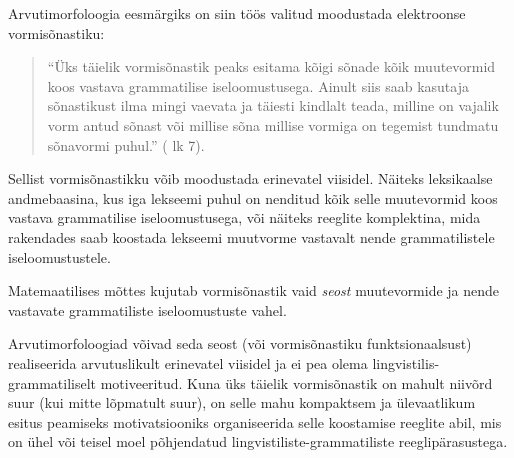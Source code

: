 \documentclass[12pt,a4paper]{article}
\begin{document}

Arvutimorfoloogia eesmärgiks on siin töös valitud moodustada elektroonse vormisõnastiku:
\begin{quote}
  ``Üks täielik vormisõnastik peaks esitama kõigi sõnade kõik muutevormid koos vastava grammatilise iseloomustusega. Ainult siis saab kasutaja sõnastikust ilma mingi vaevata ja täiesti kindlalt teada, milline on vajalik vorm antud sõnast või millise sõna millise vormiga on tegemist tundmatu sõnavormi puhul.'' (\cite{viks_vaike_1992} lk 7).
\end{quote}

Sellist vormisõnastikku võib moodustada erinevatel viisidel. Näiteks leksikaalse andme\-baasina, kus iga lekseemi puhul on nenditud kõik selle muutevormid koos vastava grammatilise iseloomustusega, või näiteks reeglite komplektina, mida rakendades saab koostada lekseemi muutvorme vastavalt nende grammatilistele iseloomustustele.

Matemaatilises mõttes kujutab vormisõnastik vaid \textit{seost} muutevormide ja nende vastavate grammatiliste iseloomustuste vahel. 

Arvutimorfoloogiad võivad seda seost (või vormisõnastiku funktsionaalsust) realiseerida arvutuslikult erinevatel viisidel ja ei pea olema lingvistilis-grammatiliselt motiveeritud. Kuna üks täielik vormisõnastik on mahult niivõrd suur (kui mitte lõpmatult suur), on selle mahu kompaktsem ja ülevaatlikum esitus peamiseks motivatsiooniks organiseerida selle koostamise reeglite abil, mis on ühel või teisel moel põhjendatud lingvistiliste-grammatiliste reeglipärasustega.
\end{document}
